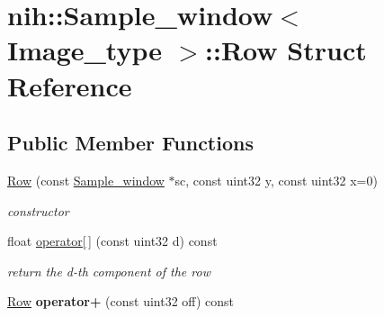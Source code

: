\hypertarget{structnih_1_1_sample__window_1_1_row}{
\section{nih\-:\-:\-Sample\-\_\-window$<$ \-Image\-\_\-type $>$\-:\-:\-Row \-Struct \-Reference}
\label{structnih_1_1_sample__window_1_1_row}
}
\subsection*{\-Public \-Member \-Functions}
\begin{DoxyCompactItemize}
\item 
\hypertarget{structnih_1_1_sample__window_1_1_row_ad56f15f4c11efe9b93fc636436b4ac16}{
\hyperlink{structnih_1_1_sample__window_1_1_row_ad56f15f4c11efe9b93fc636436b4ac16}{\-Row} (const \hyperlink{classnih_1_1_sample__window}{\-Sample\-\_\-window} $\ast$sc, const uint32 y, const uint32 x=0)}
\label{structnih_1_1_sample__window_1_1_row_ad56f15f4c11efe9b93fc636436b4ac16}

\begin{DoxyCompactList}\small\item\em constructor \end{DoxyCompactList}\item 
\hypertarget{structnih_1_1_sample__window_1_1_row_a10357923063972e3b6f862fa69066acd}{
float \hyperlink{structnih_1_1_sample__window_1_1_row_a10357923063972e3b6f862fa69066acd}{operator\mbox{[}$\,$\mbox{]}} (const uint32 d) const }
\label{structnih_1_1_sample__window_1_1_row_a10357923063972e3b6f862fa69066acd}

\begin{DoxyCompactList}\small\item\em return the d-\/th component of the row \end{DoxyCompactList}\item 
\hypertarget{structnih_1_1_sample__window_1_1_row_af13812e5f4d32a83a1d8d821a580188e}{
\hyperlink{structnih_1_1_sample__window_1_1_row}{\-Row} {\bfseries operator+} (const uint32 off) const }
\label{structnih_1_1_sample__window_1_1_row_af13812e5f4d32a83a1d8d821a580188e}

\end{DoxyCompactItemize}
